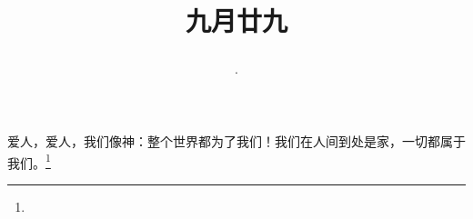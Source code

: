\title{\date[d=31,m=10,y=2024][year:cn-y,年,month:cn,day:cn,日,·,weekday]·九月廿九 }
爱人，爱人，我们像神：整个世界都为了我们！我们在人间到处是家，一切都属于我们。\footnote{ }

